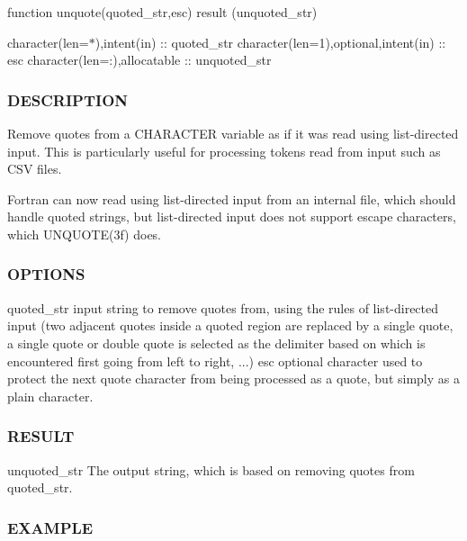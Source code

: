 function unquote(quoted\+\_\+str,esc) result (unquoted\+\_\+str)

character(len=$\ast$),intent(in) \+:\+: quoted\+\_\+str character(len=1),optional,intent(in) \+:\+: esc character(len=\+:),allocatable \+:\+: unquoted\+\_\+str \subsubsection*{D\+E\+S\+C\+R\+I\+P\+T\+I\+ON}

Remove quotes from a C\+H\+A\+R\+A\+C\+T\+ER variable as if it was read using list-\/directed input. This is particularly useful for processing tokens read from input such as C\+SV files.

Fortran can now read using list-\/directed input from an internal file, which should handle quoted strings, but list-\/directed input does not support escape characters, which U\+N\+Q\+U\+O\+T\+E(3f) does. \subsubsection*{O\+P\+T\+I\+O\+NS}

quoted\+\_\+str input string to remove quotes from, using the rules of list-\/directed input (two adjacent quotes inside a quoted region are replaced by a single quote, a single quote or double quote is selected as the delimiter based on which is encountered first going from left to right, ...) esc optional character used to protect the next quote character from being processed as a quote, but simply as a plain character. \subsubsection*{R\+E\+S\+U\+LT}

unquoted\+\_\+str The output string, which is based on removing quotes from quoted\+\_\+str. \subsubsection*{E\+X\+A\+M\+P\+LE}

